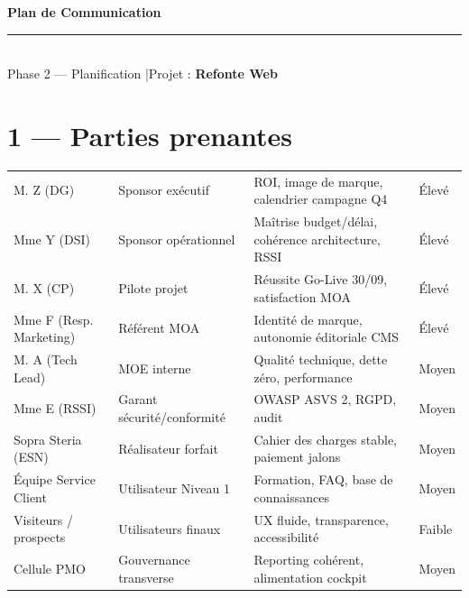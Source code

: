 \documentclass[11pt,a4paper,oneside]{report}
\begin{document}
\small

\begin{center}
{\LARGE\bfseries\color{cnNavy} Plan de Communication}\\[4pt]
\textcolor{cnOrange}{\rule{10cm}{1pt}}\\[4pt]
{\large\color{cnSlate} Phase 2 --- Planification \quad|\quad Projet : \textbf{Refonte Web}}
\end{center}

\vspace{6pt}

\section*{1 --- Parties prenantes}

\renewcommand{\arraystretch}{1.4}
\begin{tabularx}{\textwidth}{L{4cm} L{3cm} Y C{2.5cm}}
\toprule
{} &  &  &  \\
\midrule
M. Z (DG)        & Sponsor exécutif & ROI, image de marque, calendrier campagne Q4 & Élevé \\
Mme Y (DSI)        & Sponsor opérationnel & Maîtrise budget/délai, cohérence architecture, RSSI & Élevé \\
M. X (CP)         & Pilote projet & Réussite Go-Live 30/09, satisfaction MOA & Élevé \\
Mme F (Resp. Marketing) & Référent MOA & Identité de marque, autonomie éditoriale CMS & Élevé \\
M. A (Tech Lead) & MOE interne & Qualité technique, dette zéro, performance & Moyen \\
Mme E (RSSI)      & Garant sécurité/conformité & OWASP ASVS 2, RGPD, audit & Moyen \\
Sopra Steria (ESN)     & Réalisateur forfait & Cahier des charges stable, paiement jalons & Moyen \\
Équipe Service Client  & Utilisateur Niveau 1 & Formation, FAQ, base de connaissances & Moyen \\
Visiteurs / prospects  & Utilisateurs finaux & UX fluide, transparence, accessibilité & Faible \\
Cellule PMO            & Gouvernance transverse & Reporting cohérent, alimentation cockpit & Moyen \\
\bottomrule
\end{tabularx}
\end{document}
